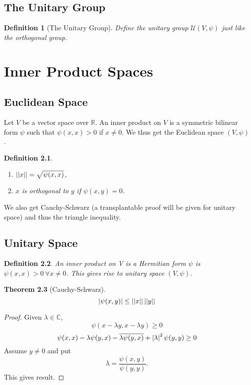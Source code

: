 \documentclass{notes}
\theoremstyle{plain}
\newtheorem{theorem}{Theorem}[chapter]
\newtheorem{definition}[theorem]{Definition}
\begin{document}
\section{The Unitary Group}

\begin{definition}[The Unitary Group]
  Define the unitary group $\mathcal{U}(V,\psi)$ just like the
  orthogonal group.
\end{definition}

\chapter{Inner Product Spaces}

\section{Euclidean Space}

Let $V$ be a vector space over $\mathbb{R}$.  An inner product on $V$
is a symmetric bilinear form $\psi$ such that $\psi(x,x) > 0$ if $x
\ne 0$.  We thus get the Euclidean space $(V,\psi)$.

\begin{definition}
\begin{enumerate}
\item $\left|\left|x\right|\right| = \sqrt{\psi(x,x)}$,
\item $x$ is orthogonal to $y$ if $\psi(x,y)=0$.
\end{enumerate}
\end{definition}

We also get Cauchy-Schwarz (a transplantable proof will be given for
unitary space) and thus the triangle inequality.

\section{Unitary Space}

\begin{definition}
  An inner product on V is a Hermitian form $\psi$ is $\psi(x,x) > 0
  \: \forall x \ne 0$.  This gives rise to unitary space $(V,\psi)$.
\end{definition}

\begin{theorem}[Cauchy-Schwarz]
\[
\left|\psi(x,y)\right| \le \left|\left|x\right|\right|\left|\left|y\right|\right|
\]
\end{theorem}

\begin{proof}
  Given $\lambda \in \mathbb{C}$,
\[
\psi(x-\lambda y,x-\lambda y) \ge 0
\]
\[
\psi(x,x)-\lambda \psi(y,x)- \overline{\lambda\psi(y,x)} +
\left|\lambda\right|^2\psi(y,y) \ge 0
\]
Assume $y \ne 0$ and put
\[
\lambda=\frac{\psi(x,y)}{\psi(y,y)}.
\]
This gives result.
\end{proof}
\end{document}
